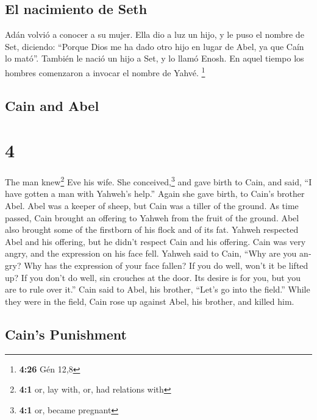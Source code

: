 \begin{paracol}{2}
\hypertarget{el-nacimiento-de-seth}{%
\subsection{El nacimiento de Seth}\label{el-nacimiento-de-seth}}

 Adán volvió a conocer a su mujer. Ella dio a luz un
hijo, y le puso el nombre de Set, diciendo: ``Porque Dios me ha dado
otro hijo en lugar de Abel, ya que Caín lo mató''. 
También le nació un hijo a Set, y lo llamó Enosh. En aquel tiempo los
hombres comenzaron a invocar el nombre de Yahvé. \footnote{\textbf{4:26}
  Gén 12,8}

\switchcolumn
\begin{otherlanguage}{english}

\hypertarget{cain-and-abel}{%
\subsection{Cain and Abel}\label{cain-and-abel}}

\hypertarget{section-7}{%
\section{4}\label{section-7}}

 The man knew\footnote{\textbf{4:1} or, lay with, or, had
  relations with} Eve his wife. She conceived,\footnote{\textbf{4:1} or,
  became pregnant} and gave birth to Cain, and said, ``I have gotten a
man with Yahweh's help.''  Again she gave birth, to Cain's
brother Abel. Abel was a keeper of sheep, but Cain was a tiller of the
ground.  As time passed, Cain brought an offering to
Yahweh from the fruit of the ground.  Abel also brought
some of the firstborn of his flock and of its fat. Yahweh respected Abel
and his offering,  but he didn't respect Cain and his
offering. Cain was very angry, and the expression on his face fell.
 Yahweh said to Cain, ``Why are you angry? Why has the
expression of your face fallen?  If you do well, won't it
be lifted up? If you don't do well, sin crouches at the door. Its desire
is for you, but you are to rule over it.''  Cain said to
Abel, his brother, ``Let's go into the field.'' While they were in the
field, Cain rose up against Abel, his brother, and killed him.

\hypertarget{cains-punishment}{%
\subsection{Cain's Punishment}\label{cains-punishment}}


\end{otherlanguage}
\end{paracol}
